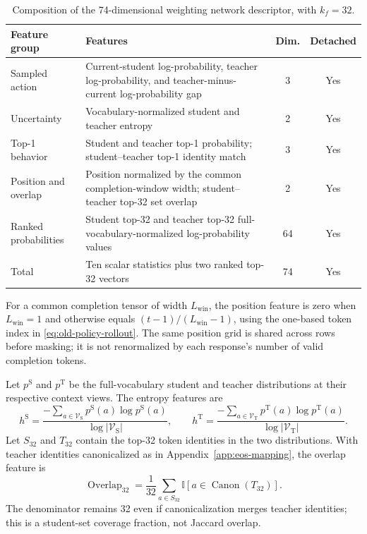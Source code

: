 \documentclass{article}
\theoremstyle{plain}
\theoremstyle{definition}
\theoremstyle{remark}
\begin{document}
\begin{table}[!htb]
\centering
\small
\setlength{\tabcolsep}{4pt}
\renewcommand{\arraystretch}{1.08}
\caption{Composition of the 74-dimensional weighting network descriptor, with \(k_f=32\).}
\label{tab:descriptor}
\begin{tabular}{@{}p{}p{}cc@{}}
\toprule
Feature group & Features & Dim. & Detached \\
\midrule
Sampled action
& Current-student log-probability, teacher log-probability, and teacher-minus-current log-probability gap
& 3 & Yes \\
Uncertainty
& Vocabulary-normalized student and teacher entropy
& 2 & Yes \\
Top-1 behavior
& Student and teacher top-1 probability; student--teacher top-1 identity match
& 3 & Yes \\
Position and overlap
& Position normalized by the common completion-window width; student--teacher top-32 set overlap
& 2 & Yes \\
Ranked probabilities
& Student top-32 and teacher top-32 full-vocabulary-normalized log-probability values
& 64 & Yes \\
\midrule
Total & Ten scalar statistics plus two ranked top-32 vectors & 74 & Yes \\
\bottomrule
\end{tabular}
\end{table}

For a common completion tensor of width \(L_{\mathrm{win}}\), the position feature is zero when \(L_{\mathrm{win}}=1\) and otherwise equals \((t-1)/(L_{\mathrm{win}}-1)\), using the one-based token index in \cref{eq:old-policy-rollout}. The same position grid is shared across rows before masking; it is not renormalized by each response's number of valid completion tokens.

Let \(p^{\mathrm S}\) and \(p^{\mathrm T}\) be the full-vocabulary student and teacher distributions
at their respective context views. The entropy features are
\[
    h^{\mathrm S}=\frac{-\sum_{a\in\mathcal V_{\mathrm S}}p^{\mathrm S}(a)\log p^{\mathrm S}(a)}
                          {\log|\mathcal V_{\mathrm S}|},
    \qquad
    h^{\mathrm T}=\frac{-\sum_{a\in\mathcal V_{\mathrm T}}p^{\mathrm T}(a)\log p^{\mathrm T}(a)}
                          {\log|\mathcal V_{\mathrm T}|}.
\]
Let \(S_{32}\) and \(T_{32}\) contain the top-32 token identities in the two distributions.
With teacher identities canonicalized as in Appendix~\ref{app:eos-mapping}, the overlap feature is
\[
    \operatorname{Overlap}_{32}
    =\frac{1}{32}\sum_{a\in S_{32}}
       \mathbb I\!\left[a\in\operatorname{Canon}(T_{32})\right].
\]
The denominator remains 32 even if canonicalization merges teacher identities; this is a
student-set coverage fraction, not Jaccard overlap.
\end{document}
